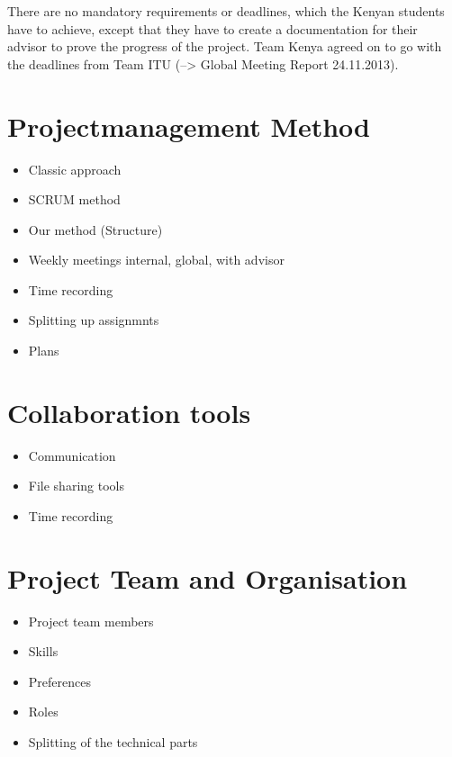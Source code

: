 
There are no mandatory requirements or deadlines, which the Kenyan students have to achieve, except that they have to create a documentation for their advisor to prove the progress of the project. Team Kenya agreed on to go with the deadlines from Team ITU (--> Global Meeting Report 24.11.2013).


\section{Projectmanagement Method}

	\begin{itemize}
		\item Classic approach
		\item SCRUM method
		\item Our method (Structure)
			\item Weekly meetings internal, global, with advisor
			\item Time recording
			\item Splitting up assignmnts
			\item Plans
	\end{itemize}


\section{Collaboration tools}

	\begin{itemize}
		\item Communication
		\item File sharing tools
		\item Time recording
	\end{itemize}


\section{Project Team and Organisation}

	\begin{itemize}
		\item Project team members
		\item Skills
		\item Preferences
		\item Roles
		\item Splitting of the technical parts
	\end{itemize}



